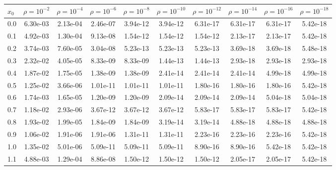 \begin{table}[h!]
\centering
\footnotesize
\begin{tabular}{l|c|c|c|c|c|c|c|c|c|}
\toprule
$x_0$ & $\rho=10^{-2}$ & $\rho=10^{-4}$ & $\rho=10^{-6}$ & $\rho=10^{-8}$ & $\rho=10^{-10}$ & $\rho=10^{-12}$ & $\rho=10^{-14}$ & $\rho=10^{-16}$ & $\rho=10^{-18}$ \\
\midrule
0.0 & 6.30e-03 & 2.13e-04 & 2.46e-07 & 3.94e-12 & 3.94e-12 & 6.31e-17 & 6.31e-17 & 6.31e-17 & 5.42e-18 \\
0.1 & 4.92e-03 & 1.30e-04 & 9.13e-08 & 1.54e-12 & 1.54e-12 & 1.54e-12 & 2.13e-17 & 2.13e-17 & 5.42e-18 \\
0.2 & 3.74e-03 & 7.60e-05 & 3.04e-08 & 5.23e-13 & 5.23e-13 & 5.23e-13 & 3.69e-18 & 3.69e-18 & 5.48e-18 \\
0.3 & 2.32e-02 & 4.05e-05 & 8.33e-09 & 8.33e-09 & 1.44e-13 & 1.44e-13 & 2.93e-18 & 2.93e-18 & 2.93e-18 \\
0.4 & 1.87e-02 & 1.75e-05 & 1.38e-09 & 1.38e-09 & 2.41e-14 & 2.41e-14 & 2.41e-14 & 4.99e-18 & 4.99e-18 \\
0.5 & 1.25e-02 & 3.66e-06 & 1.01e-11 & 1.01e-11 & 1.01e-11 & 1.80e-16 & 1.80e-16 & 1.80e-16 & 5.42e-18 \\
0.6 & 1.74e-03 & 1.65e-05 & 1.20e-09 & 1.20e-09 & 2.09e-14 & 2.09e-14 & 2.09e-14 & 5.04e-18 & 5.04e-18 \\
0.7 & 1.18e-02 & 2.93e-06 & 3.67e-12 & 3.67e-12 & 3.67e-12 & 5.83e-17 & 5.83e-17 & 5.83e-17 & 5.42e-18 \\
0.8 & 1.93e-02 & 1.99e-05 & 1.84e-09 & 1.84e-09 & 3.19e-14 & 3.19e-14 & 4.88e-18 & 4.88e-18 & 4.88e-18 \\
0.9 & \cellcolor{red!25}1.06e-02 & \cellcolor{red!25}1.91e-06 & \cellcolor{red!25}1.91e-06 & \cellcolor{red!25}1.31e-11 & \cellcolor{red!25}1.31e-11 & \cellcolor{red!25}2.23e-16 & \cellcolor{red!25}2.23e-16 & \cellcolor{red!25}2.23e-16 & \cellcolor{red!25}5.42e-18 \\
1.0 & \cellcolor{red!25}1.35e-02 & \cellcolor{red!25}5.01e-06 & \cellcolor{red!25}5.09e-11 & \cellcolor{red!25}5.09e-11 & \cellcolor{red!25}5.09e-11 & \cellcolor{red!25}8.90e-16 & \cellcolor{red!25}8.90e-16 & \cellcolor{red!25}5.42e-18 & \cellcolor{red!25}5.42e-18 \\
1.1 & \cellcolor{red!25}4.88e-03 & \cellcolor{red!25}1.29e-04 & \cellcolor{red!25}8.86e-08 & \cellcolor{red!25}1.50e-12 & \cellcolor{red!25}1.50e-12 & \cellcolor{red!25}1.50e-12 & \cellcolor{red!25}2.05e-17 & \cellcolor{red!25}2.05e-17 & \cellcolor{red!25}5.42e-18 \\

\end{tabular}
\end{table}

